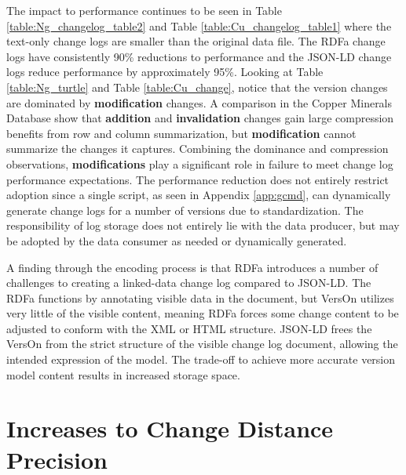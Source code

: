 The impact to performance continues to be seen in Table \ref{table:Ng_changelog_table2} and Table \ref{table:Cu_changelog_table1} where the text-only change logs are smaller than the original data file.
The RDFa change logs have consistently 90\% reductions to performance and the JSON-LD change logs reduce performance by approximately 95\%.
Looking at Table \ref{table:Ng_turtle} and Table \ref{table:Cu_change}, notice that the version changes are dominated by \textbf{modification} changes.
A comparison in the Copper Minerals Database show that \textbf{addition} and \textbf{invalidation} changes gain large compression benefits from row and column summarization, but \textbf{modification} cannot summarize the changes it captures.
Combining the dominance and compression observations, \textbf{modifications} play a significant role in failure to meet change log performance expectations.
The performance reduction does not entirely restrict adoption since a single script, as seen in Appendix \ref{app:gcmd}, can dynamically generate change logs for a number of versions due to standardization.
The responsibility of log storage does not entirely lie with the data producer, but may be adopted by the data consumer as needed or dynamically generated.

A finding through the encoding process is that RDFa introduces a number of challenges to creating a linked-data change log compared to JSON-LD.
The RDFa functions by annotating visible data in the document, but VersOn utilizes very little of the visible content, meaning RDFa forces some change content to be adjusted to conform with the XML or HTML structure.
JSON-LD frees the VersOn from the strict structure of the visible change log document, allowing the intended expression of the model.
The trade-off to achieve more accurate version model content results in increased storage space.

\section{Increases to Change Distance Precision}

